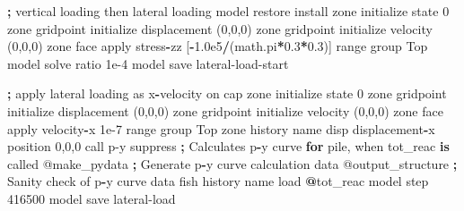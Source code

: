\documentclass[a4paper, nobind]{templates/ociamthesis}
\newenvironment{Shaded}{\begin{snugshade}}{\end{snugshade}}
\newcommand{\AttributeTok}[1]{\textcolor[rgb]{0.77,0.63,0.00}{#1}}
\newcommand{\BuiltInTok}[1]{#1}
\newcommand{\ControlFlowTok}[1]{\textcolor[rgb]{0.13,0.29,0.53}{\textbf{#1}}}
\newcommand{\DecValTok}[1]{\textcolor[rgb]{0.00,0.00,0.81}{#1}}
\newcommand{\FloatTok}[1]{\textcolor[rgb]{0.00,0.00,0.81}{#1}}
\newcommand{\ImportTok}[1]{#1}
\newcommand{\KeywordTok}[1]{\textcolor[rgb]{0.13,0.29,0.53}{\textbf{#1}}}
\newcommand{\NormalTok}[1]{#1}
\newcommand{\OperatorTok}[1]{\textcolor[rgb]{0.81,0.36,0.00}{\textbf{#1}}}
\newcommand{\StringTok}[1]{\textcolor[rgb]{0.31,0.60,0.02}{#1}}
\renewenvironment{Shaded}
{
  \vspace{10pt}%
  \begin{snugshade}%
}{%
  \end{snugshade}%
  \vspace{8pt}%
}
\begin{document}
\begin{Shaded}
\begin{Highlighting}[]
\OperatorTok{;}\NormalTok{ vertical loading then lateral loading}
\NormalTok{model restore }\StringTok{\textquotesingle{}install\textquotesingle{}}
\NormalTok{zone initialize state }\DecValTok{0}
\NormalTok{zone gridpoint initialize displacement (}\DecValTok{0}\NormalTok{,}\DecValTok{0}\NormalTok{,}\DecValTok{0}\NormalTok{)}
\NormalTok{zone gridpoint initialize velocity     (}\DecValTok{0}\NormalTok{,}\DecValTok{0}\NormalTok{,}\DecValTok{0}\NormalTok{) }
\NormalTok{zone face }\BuiltInTok{apply}\NormalTok{ stress}\OperatorTok{{-}}\NormalTok{zz [}\OperatorTok{{-}}\FloatTok{1.0e5}\OperatorTok{/}\NormalTok{(math.pi}\OperatorTok{*}\FloatTok{0.3}\OperatorTok{*}\FloatTok{0.3}\NormalTok{)] }\BuiltInTok{range}\NormalTok{ group }\StringTok{\textquotesingle{}Top\textquotesingle{}}
\NormalTok{model solve ratio }\FloatTok{1e{-}4}
\NormalTok{model save }\StringTok{\textquotesingle{}lateral{-}load{-}start\textquotesingle{}}

\OperatorTok{;} \BuiltInTok{apply}\NormalTok{ lateral loading }\ImportTok{as}\NormalTok{ x}\OperatorTok{{-}}\NormalTok{velocity on cap}
\NormalTok{zone initialize state }\DecValTok{0}
\NormalTok{zone gridpoint initialize displacement (}\DecValTok{0}\NormalTok{,}\DecValTok{0}\NormalTok{,}\DecValTok{0}\NormalTok{)}
\NormalTok{zone gridpoint initialize velocity     (}\DecValTok{0}\NormalTok{,}\DecValTok{0}\NormalTok{,}\DecValTok{0}\NormalTok{) }
\NormalTok{zone face }\BuiltInTok{apply}\NormalTok{ velocity}\OperatorTok{{-}}\NormalTok{x }\FloatTok{1e{-}7} \BuiltInTok{range}\NormalTok{ group }\StringTok{\textquotesingle{}Top\textquotesingle{}}
\NormalTok{zone history name }\StringTok{\textquotesingle{}disp\textquotesingle{}}\NormalTok{ displacement}\OperatorTok{{-}}\NormalTok{x position }\DecValTok{0}\NormalTok{,}\DecValTok{0}\NormalTok{,}\DecValTok{0}
\NormalTok{call }\StringTok{\textquotesingle{}p{-}y\textquotesingle{}}\NormalTok{ suppress }\OperatorTok{;}\NormalTok{ Calculates p}\OperatorTok{{-}}\NormalTok{y curve }\ControlFlowTok{for}\NormalTok{ pile, when tot\_reac }\KeywordTok{is}\NormalTok{ called}
\AttributeTok{@make\_pydata}        \OperatorTok{;}\NormalTok{ Generate p}\OperatorTok{{-}}\NormalTok{y curve calculation data }
\AttributeTok{@output\_structure}   \OperatorTok{;}\NormalTok{ Sanity check of p}\OperatorTok{{-}}\NormalTok{y curve data }
\NormalTok{fish history name }\StringTok{\textquotesingle{}load\textquotesingle{}} \OperatorTok{@}\NormalTok{tot\_reac}
\NormalTok{model step }\DecValTok{416500}
\NormalTok{model save }\StringTok{\textquotesingle{}lateral{-}load\textquotesingle{}}
\end{Highlighting}
\end{Shaded}
\end{document}
